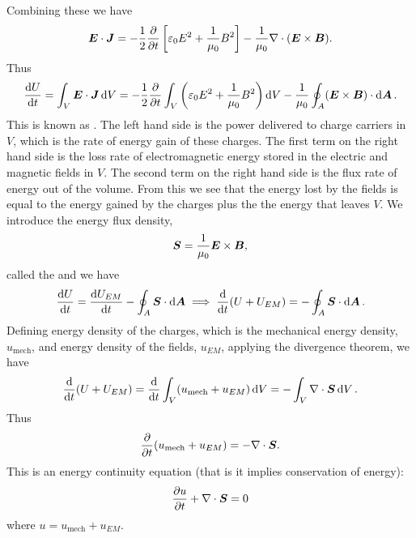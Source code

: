     Combining these we have
    \[\bm{E}\cdot\bm{J} = -\frac{1}{2}\pdv{t}\left[\varepsilon_0E^2 + \frac{1}{\mu_0}B^2\right] - \frac{1}{\mu_0}\nabla\cdot(\bm{E}\times\bm{B}).\]
    Thus
    \[\dv{U}{t} = \int_V\bm{E}\cdot\bm{J}\dd{V} = -\frac{1}{2}\pdv{t}\int_V \left(\varepsilon_0E^2 + \frac{1}{\mu_0} B^2\right) \dd{V} - \frac{1}{\mu_0}\oint_A(\bm{E}\times\bm{B})\cdot\dd{\bm{A}}.\]
    This is known as .
    The left hand side is the power delivered to charge carriers in \(V\), which is the rate of energy gain of these charges.
    The first term on the right hand side is the loss rate of electromagnetic energy stored in the electric and magnetic fields in \(V\).
    The second term on the right hand side is the flux rate of energy out of the volume.
    From this we see that the energy lost by the fields is equal to the energy gained by the charges plus the the energy that leaves \(V\).
    We introduce the energy flux density,
    \[\bm{S} = \frac{1}{\mu_0}\bm{E}\times\bm{B},\]
    called the  and we have
    \[\dv{U}{t} = \dv{U_{EM}}{t} - \oint_A \bm{S}\cdot\dd{\bm{A}} \implies \dv{t}(U + U_{EM}) = -\oint_A\bm{S}\cdot\dd{\bm{A}}.\]
    Defining energy density of the charges, which is the mechanical energy density, \(u_{\text{mech}}\), and energy density of the fields, \(u_{EM}\), applying the divergence theorem, we have
    \[\dv{t}(U + U_{EM}) = \dv{t}\int_V(u_{\text{mech}} + u_{EM})\dd{V} = -\int_V\nabla\cdot\bm{S}\dd{V}.\]
    Thus
    \[\pdv{t}(u _{\text{mech}} + u_{EM}) = -\nabla\cdot\bm{S}.\]
    This is an energy continuity equation (that is it implies conservation of energy):
    \[\pdv{u}{t} + \nabla\cdot\bm{S} = 0\]
    where \(u = u_{\text{mech}} + u_{EM}\).
    
